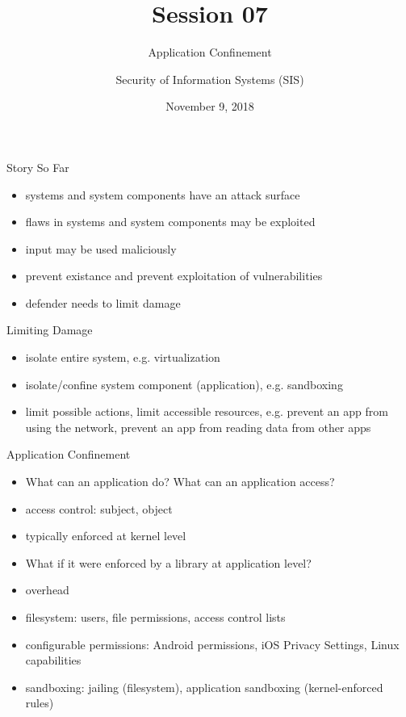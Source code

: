 \documentclass{curs}
\title[Session 07]{Session 07}
\subtitle{Application Confinement}
\author{Security of Information Systems (SIS)}
\date{November 9, 2018}
\begin{document}
\frame{\titlepage}

\begin{frame}{Story So Far}
  \begin{itemize}
    \pause \item systems and system components have an attack surface
    \pause \item flaws in systems and system components may be exploited
    \pause \item input may be used maliciously
    \pause \item prevent existance and prevent exploitation of vulnerabilities
    \pause \item defender needs to limit damage
  \end{itemize}
\end{frame}

\begin{frame}{Limiting Damage}
  \begin{itemize}
    \pause \item isolate entire system, e.g. virtualization
    \pause \item isolate/confine system component (application), e.g. sandboxing
    \pause \item limit possible actions, limit accessible resources, e.g. prevent an app from using the network, prevent an app from reading data from other apps
  \end{itemize}
\end{frame}

\begin{frame}{Application Confinement}
  \begin{itemize}
    \pause \item What can an application do? What can an application access?
    \pause \item access control: subject, object
    \pause \item typically enforced at kernel level
    \pause \item What if it were enforced by a library at application level?
    \pause \item overhead
    \pause \item filesystem: users, file permissions, access control lists
    \pause \item configurable permissions: Android permissions, iOS Privacy Settings, Linux capabilities
    \pause \item sandboxing: jailing (filesystem), application sandboxing (kernel-enforced rules)
  \end{itemize}
\end{frame}
\end{document}
